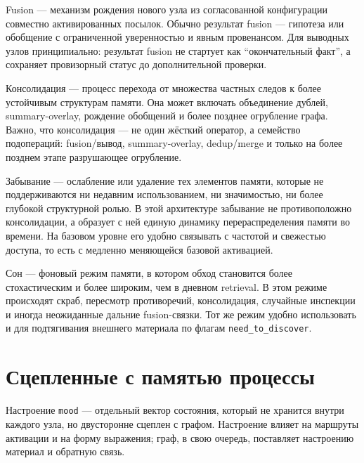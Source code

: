 \begin{definition}[Fusion]
Fusion --- механизм рождения нового узла из согласованной конфигурации
совместно активированных посылок. Обычно результат fusion --- гипотеза или
обобщение с ограниченной уверенностью и явным провенансом. Для выводных
узлов принципиально: результат fusion не стартует как ``окончательный факт'',
а сохраняет провизорный статус до дополнительной проверки.
\end{definition}

\begin{definition}[Консолидация]
Консолидация --- процесс перехода от множества частных следов к более
устойчивым структурам памяти. Она может включать объединение дублей,
summary-overlay, рождение обобщений и более позднее огрубление графа. Важно,
что консолидация --- не один жёсткий оператор, а семейство подопераций:
fusion/вывод, summary-overlay, dedup/merge и только на более позднем этапе
разрушающее огрубление.
\end{definition}

\begin{definition}[Забывание]
Забывание --- ослабление или удаление тех элементов памяти, которые не
поддерживаются ни недавним использованием, ни значимостью, ни более глубокой
структурной ролью. В этой архитектуре забывание не противоположно
консолидации, а образует с ней единую динамику перераспределения памяти во
времени. На базовом уровне его удобно связывать с частотой и свежестью
доступа, то есть с медленно меняющейся базовой активацией.
\end{definition}

\begin{definition}[Сон]
Сон --- фоновый режим памяти, в котором обход становится более стохастическим
и более широким, чем в дневном retrieval. В этом режиме происходят скраб,
пересмотр противоречий, консолидация, случайные инспекции и иногда
неожиданные дальние fusion-связки. Тот же режим удобно использовать и для
подтягивания внешнего материала по флагам \texttt{need\_to\_discover}.
\end{definition}

\section{Сцепленные с памятью процессы}

\begin{definition}[Настроение]
Настроение \texttt{mood} --- отдельный вектор состояния, который не хранится
внутри каждого узла, но двусторонне сцеплен с графом. Настроение влияет на
маршруты активации и на форму выражения; граф, в свою очередь, поставляет
настроению материал и обратную связь.
\end{definition}

